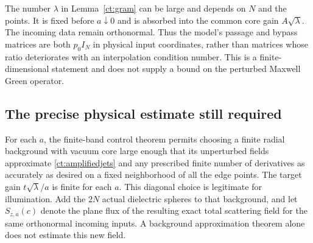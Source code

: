 \begin{remark}
\label{ct:conditioning}
The number $\lambda$ in Lemma~\ref{ct:gram} can be large and depends
on $N$ and the points. It is fixed before $a\downarrow0$ and is
absorbed into the common core gain $A\sqrt\lambda$. The incoming
data remain orthonormal. Thus the model's passage and bypass
matrices are both $p_0 I_N$ in physical input coordinates, rather
than matrices whose ratio deteriorates with an interpolation
condition number. This is a finite-dimensional statement and does
not supply a bound on the perturbed Maxwell Green operator.
\end{remark}

\subsection{The precise physical estimate still required}

For each $a$, the finite-band control theorem permits choosing a
finite radial background with vacuum core large enough that its
unperturbed fields approximate \eqref{ct:amplifiedjets} and any
prescribed finite number of derivatives as accurately as desired
on a fixed neighborhood of all the edge points. The target gain
$t\sqrt\lambda/a$ is finite for each $a$. This diagonal choice is
legitimate for illumination. Add the $2N$ actual dielectric spheres
to that background, and let $S_{z,a}(c)$ denote the plane flux of
the resulting exact total scattering field for the same orthonormal
incoming inputs. A background approximation theorem alone does
not estimate this new field.

